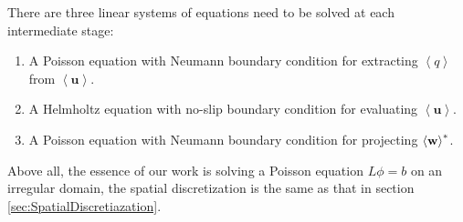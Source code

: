There are three linear systems of equations need to be solved at each
intermediate stage:
\begin{enumerate}
\item A Poisson equation with Neumann boundary condition for
  extracting $\left<q\right>$ from $\left<\mathbf{u}\right>$.
\item A Helmholtz equation with no-slip boundary condition for
  evaluating $\left<\mathbf{u}\right>$.
\item A Poisson equation with Neumann boundary condition for
  projecting $\left<{\mathbf{w}}\right>^*$.
\end{enumerate}

Above all, the essence of our work is solving a Poisson equation
$L\phi=b$ on
an irregular domain, the spatial discretization is  the same as that
in section \ref{sec:SpatialDiscretiazation}.

